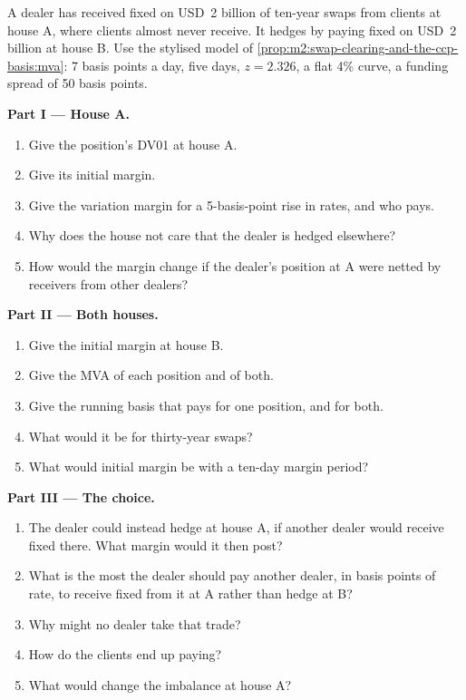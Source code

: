 \begin{problem}\label{pb:m2:swap-clearing-and-the-ccp-basis:1}
A dealer has received fixed on USD~2 billion of ten-year swaps from clients at
house A, where clients almost never receive. It hedges by paying fixed on
USD~2 billion at house B. Use the stylised model of
\cref{prop:m2:swap-clearing-and-the-ccp-basis:mva}: 7 basis points a day, five
days, $z = 2.326$, a flat 4\% curve, a funding spread of 50 basis points.

\medskip\noindent\textbf{Part I --- House A.}
\begin{enumerate}
\item Give the position's DV01 at house A.
\item Give its initial margin.
\item Give the variation margin for a 5-basis-point rise in rates, and who pays.
\item Why does the house not care that the dealer is hedged elsewhere?
\item How would the margin change if the dealer's position at A were netted by
receivers from other dealers?
\end{enumerate}

\medskip\noindent\textbf{Part II --- Both houses.}
\begin{enumerate}[resume]
\item Give the initial margin at house B.
\item Give the MVA of each position and of both.
\item Give the running basis that pays for one position, and for both.
\item What would it be for thirty-year swaps?
\item What would initial margin be with a ten-day margin period?
\end{enumerate}

\medskip\noindent\textbf{Part III --- The choice.}
\begin{enumerate}[resume]
\item The dealer could instead hedge at house A, if another dealer would receive
fixed there. What margin would it then post?
\item What is the most the dealer should pay another dealer, in basis points of
rate, to receive fixed from it at A rather than hedge at B?
\item Why might no dealer take that trade?
\item How do the clients end up paying?
\item What would change the imbalance at house A?
\end{enumerate}


\end{problem}
